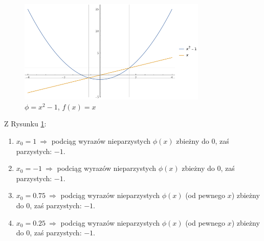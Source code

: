 \documentclass{classrep}
\begin{document}
		
		\begin{figure}[!htbp]
			\centering
			\includegraphics[width=0.8\textwidth]{zad6/Myplot2.png}
  			\caption{$\phi=x^2-1$, $f(x)=x$}
  			\label{fig:6}
		\end{figure}
		
		Z Rysunku \ref{fig:6}:
		\begin{enumerate}[1.]
			\item $x_0 = 1 ~\Rightarrow$ podciąg wyrazów nieparzystych $\phi(x)$ zbieżny do $0$, zaś parzystych: $-1$.
			\item $x_0 = -1 ~\Rightarrow$ podciąg wyrazów nieparzystych $\phi(x)$ zbieżny do $0$, zaś parzystych: $-1$.
			\item $x_0 = 0.75 ~\Rightarrow$ podciąg wyrazów nieparzystych $\phi(x)$ (od pewnego $x$) zbieżny do $0$, zaś parzystych: $-1$.
			\item $x_0 = 0.25 ~\Rightarrow$ podciąg wyrazów nieparzystych $\phi(x)$ (od pewnego $x$) zbieżny do $0$, zaś parzystych: $-1$.
		\end{enumerate}
		
\end{document}
